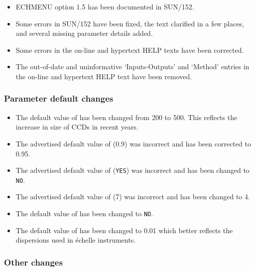 \documentclass[twoside,11pt,nolof]{starlink}
\begin{document}
\begin{itemize}
\item ECHMENU option 1.5 has been documented in SUN/152.
\item Some errors in SUN/152 have been fixed, the text clarified in
   a few places, and several missing parameter details added.
\item Some errors in the on-line and hypertext HELP texts have been
   corrected.
\item The out-of-date and uninformative `Inputs-Outputs' and `Method'
   entries in the on-line and hypertext HELP text have been removed.
\end{itemize}

\subsubsection{Parameter default changes}

\begin{itemize}
\item The default value of 
   has been changed from 200 to 500.
   This reflects the increase in size of CCDs in recent years.
\item The advertised default value of
    (0.9) was incorrect and
   has been corrected to 0.95.
\item The advertised default value of
    (\texttt{YES}) was
   incorrect and has been changed to \texttt{NO}.
\item The advertised default value of
   (7) was incorrect and has been changed to 4.
\item The default value of 
   has been changed to \texttt{NO}.
\item The default value of 
   has been changed to 0.01 which better reflects the dispersions used in
   \'{e}chelle instruments.
\end{itemize}

\subsubsection{Other changes}
\end{document}
